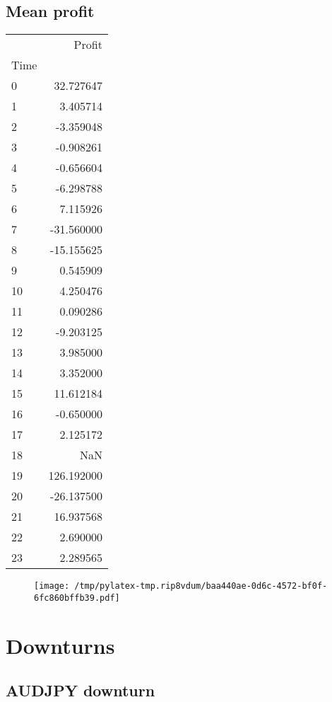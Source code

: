 \documentclass{article}%
\begin{document}
\subsection{Mean profit }%
\label{subsec:Meanprofit}%
\begin{tabular}{lr}
\toprule
{} &      Profit \\
Time &             \\
\midrule
0    &   32.727647 \\
1    &    3.405714 \\
2    &   -3.359048 \\
3    &   -0.908261 \\
4    &   -0.656604 \\
5    &   -6.298788 \\
6    &    7.115926 \\
7    &  -31.560000 \\
8    &  -15.155625 \\
9    &    0.545909 \\
10   &    4.250476 \\
11   &    0.090286 \\
12   &   -9.203125 \\
13   &    3.985000 \\
14   &    3.352000 \\
15   &   11.612184 \\
16   &   -0.650000 \\
17   &    2.125172 \\
18   &         NaN \\
19   &  126.192000 \\
20   &  -26.137500 \\
21   &   16.937568 \\
22   &    2.690000 \\
23   &    2.289565 \\
\bottomrule
\end{tabular}
%


\begin{figure}[htbp]%
\centering%
\texttt{[image: /tmp/pylatex-tmp.rip8vdum/baa440ae-0d6c-4572-bf0f-6fc860bffb39.pdf]}%
\end{figure}

%
\newpage %
\section{Downturns}%
\label{sec:Downturns}%
\subsection{AUDJPY downturn}%
\label{subsec:AUDJPYdownturn}%
\end{document}
